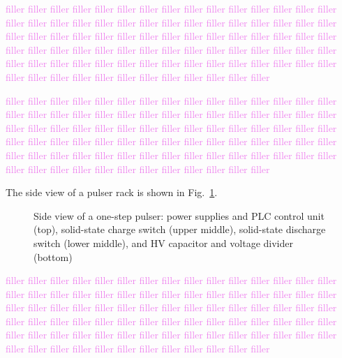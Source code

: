 \textcolor{violet}{filler filler filler filler filler filler filler filler filler filler filler filler filler filler filler filler filler filler filler filler filler filler filler filler filler filler filler filler filler filler filler filler filler filler filler filler filler filler filler filler filler filler filler filler filler filler filler filler filler filler filler filler filler filler filler filler filler filler filler filler filler filler filler filler filler filler filler filler filler filler filler filler filler filler filler filler filler filler filler filler filler filler filler filler filler filler filler}

\textcolor{violet}{filler filler filler filler filler filler filler filler filler filler filler filler filler filler filler filler filler filler filler filler filler filler filler filler filler filler filler filler filler filler filler filler filler filler filler filler filler filler filler filler filler filler filler filler filler filler filler filler filler filler filler filler filler filler filler filler filler filler filler filler filler filler filler filler filler filler filler filler filler filler filler filler filler filler filler filler filler filler filler filler filler filler filler filler filler filler filler}

The side view of a pulser rack is shown in Fig.~\ref{fig:pulser_side}.
\begin{figure}[]
	\centering
	\caption{Side view of a one-step pulser: power supplies and PLC control unit (top), solid-state charge switch (upper middle), solid-state discharge switch (lower middle), and HV capacitor and voltage divider (bottom)}\label{fig:pulser_side}
\end{figure}

\textcolor{violet}{filler filler filler filler filler filler filler filler filler filler filler filler filler filler filler filler filler filler filler filler filler filler filler filler filler filler filler filler filler filler filler filler filler filler filler filler filler filler filler filler filler filler filler filler filler filler filler filler filler filler filler filler filler filler filler filler filler filler filler filler filler filler filler filler filler filler filler filler filler filler filler filler filler filler filler filler filler filler filler filler filler filler filler filler filler filler filler}


